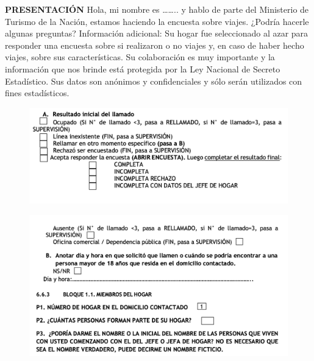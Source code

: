 \documentclass[
  openany]{book}
\begin{document}
\textbf{PRESENTACIÓN}
Hola, mi nombre es \ldots\ldots.. y hablo de parte del Ministerio de Turismo de la Nación, estamos haciendo la encuesta sobre viajes. ¿Podría hacerle algunas preguntas? Información adicional:
Su hogar fue seleccionado al azar para responder una encuesta sobre si realizaron o no viajes y, en caso de haber hecho viajes, sobre sus características.
Su colaboración es muy importante y la información que nos brinde está protegida por la Ley Nacional de Secreto Estadístico. Sus datos son anónimos y confidenciales y sólo serán utilizados con fines estadísticos.

\begin{figure}

{\centering \includegraphics[width=1\linewidth]{imagenes/figura6-152} 

}

\end{figure}
\begin{figure}

{\centering \includegraphics[width=1\linewidth]{imagenes/figura6-153} 

}

\end{figure}
\end{document}
